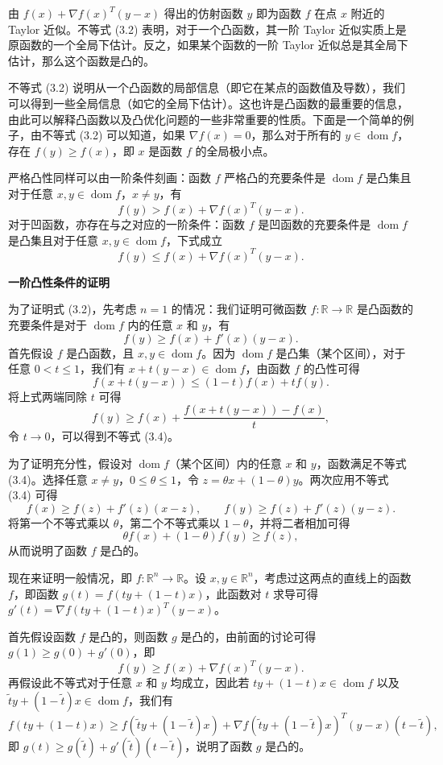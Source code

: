 \documentclass[UTF8, 12pt, fontset=fandol, oneside]{ctexart}
\DeclareMathOperator{\dom}{dom}
\begin{document}
由 $f(x)+\nabla f(x)^T(y-x)$ 得出的仿射函数 $y$ 即为函数 $f$ 在点 $x$ 附近的 Taylor 近似。不等式 (3.2) 表明，对于一个凸函数，其一阶 Taylor 近似实质上是原函数的一个全局下估计。反之，如果某个函数的一阶 Taylor 近似总是其全局下估计，那么这个函数是凸的。

不等式 (3.2) 说明从一个凸函数的局部信息（即它在某点的函数值及导数），我们可以得到一些全局信息（如它的全局下估计）。这也许是凸函数的最重要的信息，由此可以解释凸函数以及凸优化问题的一些非常重要的性质。下面是一个简单的例子，由不等式 (3.2) 可以知道，如果 $\nabla f(x)=0$，那么对于所有的 $y\in\dom f$，存在 $f(y)\geq f(x)$，即 $x$ 是函数 $f$ 的全局极小点。

严格凸性同样可以由一阶条件刻画：函数 $f$ 严格凸的充要条件是 $\dom f$ 是凸集且对于任意 $x,y\in\dom f$，$x\neq y$，有
\begin{equation}
f(y)>f(x)+\nabla f(x)^T(y-x).
\tag{3.3}
\end{equation}
对于凹函数，亦存在与之对应的一阶条件：函数 $f$ 是凹函数的充要条件是 $\dom f$ 是凸集且对于任意 $x,y\in\dom f$，下式成立
\[
f(y)\leq f(x)+\nabla f(x)^T(y-x).
\]

\noindent\textbf{一阶凸性条件的证明}

为了证明式 (3.2)，先考虑 $n=1$ 的情况：我们证明可微函数 $f:\mathbb{R}\to\mathbb{R}$ 是凸函数的充要条件是对于 $\dom f$ 内的任意 $x$ 和 $y$，有
\begin{equation}
f(y)\geq f(x)+f'(x)(y-x).
\tag{3.4}
\end{equation}
首先假设 $f$ 是凸函数，且 $x,y\in\dom f$。因为 $\dom f$ 是凸集（某个区间），对于任意 $0<t\leq 1$，我们有 $x+t(y-x)\in\dom f$，由函数 $f$ 的凸性可得
\[
f(x+t(y-x))\leq (1-t)f(x)+tf(y).
\]
将上式两端同除 $t$ 可得
\[
f(y)\geq f(x)+\frac{f(x+t(y-x))-f(x)}{t},
\]
令 $t\to0$，可以得到不等式 (3.4)。

为了证明充分性，假设对 $\dom f$（某个区间）内的任意 $x$ 和 $y$，函数满足不等式 (3.4)。选择任意 $x\neq y$，$0\leq\theta\leq 1$，令 $z=\theta x+(1-\theta)y$。两次应用不等式 (3.4) 可得
\[
f(x)\geq f(z)+f'(z)(x-z),\qquad f(y)\geq f(z)+f'(z)(y-z).
\]
将第一个不等式乘以 $\theta$，第二个不等式乘以 $1-\theta$，并将二者相加可得
\[
\theta f(x)+(1-\theta)f(y)\geq f(z),
\]
从而说明了函数 $f$ 是凸的。

现在来证明一般情况，即 $f:\mathbb{R}^n\to\mathbb{R}$。设 $x,y\in\mathbb{R}^n$，考虑过这两点的直线上的函数 $f$，即函数 $g(t)=f(ty+(1-t)x)$，此函数对 $t$ 求导可得 $g'(t)=\nabla f(ty+(1-t)x)^T(y-x)$。

首先假设函数 $f$ 是凸的，则函数 $g$ 是凸的，由前面的讨论可得 $g(1)\geq g(0)+g'(0)$，即
\[
f(y)\geq f(x)+\nabla f(x)^T(y-x).
\]
再假设此不等式对于任意 $x$ 和 $y$ 均成立，因此若 $ty+(1-t)x\in\dom f$ 以及 $\tilde t y+(1-\tilde t)x\in\dom f$，我们有
\[
f(ty+(1-t)x)\geq f(\tilde t y+(1-\tilde t)x)+\nabla f(\tilde t y+(1-\tilde t)x)^T(y-x)(t-\tilde t),
\]
即 $g(t)\geq g(\tilde t)+g'(\tilde t)(t-\tilde t)$，说明了函数 $g$ 是凸的。
\end{document}
